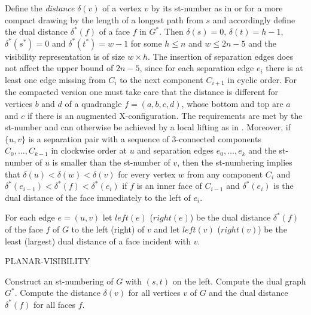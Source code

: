 \documentclass[runningheads]{llncs}
\begin{document}
Define the  \emph{distance} $\delta(v)$ of a vertex $v$ by its
st-number as in \cite{rt-rplbopg-86, TT-vrpg-86} or for a more
compact drawing \cite{dett-gdavg-99} by the length of a longest path
from $s$ and accordingly define the dual distance $\delta^*(f)$ of a
face $f$ in $G^*$.  Then $\delta(s)=0$, $\delta(t)=h-1$,
$\delta^*(s^*)=0$ and $\delta^*(t^*) = w-1$ for some $h \leq n$ and
$w \leq 2n-5$ and the visibility representation is of size $w \times
h$. The insertion of separation edges does not affect the upper
bound of $2n-5$, since for each separation edge $e_i$ there is at
least one edge missing from $C_i$ to the next component $C_{i+1}$ in
cyclic order. For the compacted version one must take care that the
distance is different for vertices $b$ and $d$ of a quadrangle $f =
(a,b,c,d)$, whose bottom and top are $a$ and $c$ if there is an
augmented X-configuration. The  requirements are met by the
st-number and can otherwise be achieved by a local lifting as in
\cite{b-sdogs-11}. Moreover, if $\{u,v\}$ is a separation pair with
a sequence of $3$-connected components $C_0,\ldots, C_{k-1}$ in
clockwise order at $u$ and separation edges $e_0, \ldots, e_k$ and
the st-number of $u$ is smaller than the st-number of $v$, then the
st-numbering implies that $\delta(u) < \delta(w) < \delta(v)$ for
every vertex $w$ from any component $C_i$ and $\delta^*(e_{i-1}) <
\delta^*(f) < \delta^*(e_i)$ if $f$ is an inner face of $C_{i-1}$
and $\delta^*(e_i)$ is the dual distance of the face immediately to
the left of $e_i$.


For each edge $e=(u, v)$ let $left(e)$ ($right(e)$) be the dual
distance $\delta^*(f)$ of the face $f$ of $G$ to the left (right) of
$v$ and let $left(v)$ ($right(v)$) be the least (largest) dual
distance
of a face incident with $v$.\\





\begin{algorithm}
  \caption{PLANAR-VISIBILITY}\label{alg:planar-visibility}



Construct an st-numbering of  $G$ with $(s,t)$ on the left.\;
  Compute the dual graph  $G^*$.\;
  Compute the distance   $\delta(v)$ for all vertices $v$ of $G$  and the dual
  distance $\delta^*(f)$ for all faces $f$.\;
\end{algorithm}
\end{document}
